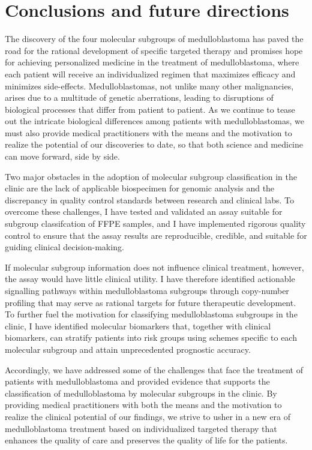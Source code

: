 \chapter{Conclusions and future directions}
\label{ch:conclusion}

The discovery of the four molecular subgroups of medulloblastoma has paved the road for the rational development of specific targeted therapy and promises hope for achieving personalized medicine in the treatment of medulloblastoma, where each patient will receive an individualized regimen that maximizes efficacy and minimizes side-effects. Medulloblastomas, not unlike many other malignancies, arises due to a multitude of genetic aberrations, leading to disruptions of biological processes that differ from patient to patient. As we continue to tease out the intricate biological differences among patients with medulloblastomas, we must also provide medical practitioners with the means and the motivation to realize the potential of our discoveries to date, so that both science and medicine can move forward, side by side.

Two major obstacles in the adoption of molecular subgroup classification in the clinic are the lack of applicable biospecimen for genomic analysis and the discrepancy in quality control standards between research and clinical labs. To overcome these challenges, I have tested and validated an assay suitable for subgroup classifcation of FFPE samples, and I have implemented rigorous quality control to ensure that the assay results are reproducible, credible, and suitable for guiding clinical decision-making.

If molecular subgroup information does not influence clinical treatment, however, the assay would have little clinical utility. I have therefore identified actionable signalling pathways within medulloblastoma subgroups through copy-number profiling that may serve as rational targets for future therapeutic development. To further fuel the motivation for classifying medulloblastoma subgroups in the clinic, I have identified molecular biomarkers that, together with clinical biomarkers, can stratify patients into risk groups using schemes specific to each molecular subgroup and attain unprecedented prognostic accuracy.

Accordingly, we have addressed some of the challenges that face the treatment of patients with medulloblastoma and provided evidence that supports the classification of medulloblastoma by molecular subgroups in the clinic. By providing medical practitioners with both the means and the motivation to realize the clinical potential of our findings, we strive to usher in a new era of medulloblastoma treatment based on individualized targeted therapy that enhances the quality of care and preserves the quality of life for the patients.

